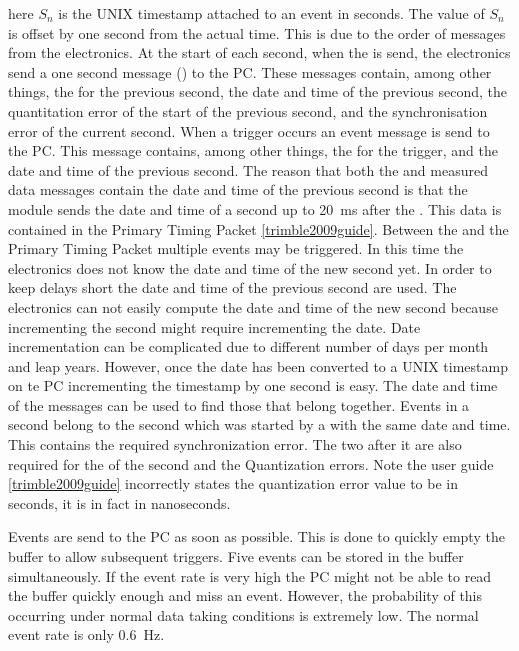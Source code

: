here $S_n$ is the UNIX timestamp attached to an event in seconds. The value of $S_n$ is offset by one second from the actual time. This is due to the order of messages from the \hisparc electronics. At the start of each second, when the \pps is send, the \hisparc electronics send a one second message (\osm) to the PC. These messages contain, among other things, the \ctp for the previous second, the date and time of the previous second, the quantitation error of the start of the previous second, and the synchronisation error of the current second. When a trigger occurs an event message is send to the PC. This message contains, among other things, the \ctd for the trigger, and the date and time of the previous second. The reason that both the \osm and measured data messages contain the date and time of the previous second is that the \gps module sends the date and time of a second up to \SI{20}{\milli\second} after the \pps. This data is contained in the Primary Timing Packet \cref{trimble2009guide}. Between the \pps and the Primary Timing Packet multiple events may be triggered. In this time the electronics does not know the date and time of the new second yet. In order to keep delays short the date and time of the previous second are used. The electronics can not easily compute the date and time of the new second because incrementing the second might require incrementing the date. Date incrementation can be complicated due to different number of days per month and leap years. However, once the date has been converted to a UNIX timestamp on te PC incrementing the timestamp by one second is easy. The date and time of the messages can be used to find those that belong together. Events in a second belong to the second which was started by a \osm with the same date and time. This \osm contains the required synchronization error. The two \osm after it are also required for the \ctp of the second and the Quantization errors. Note the user guide \cref{trimble2009guide} incorrectly states the quantization error value to be in seconds, it is in fact in nanoseconds.

Events are send to the PC as soon as possible. This is done to quickly empty the buffer to allow subsequent triggers. Five events can be stored in the buffer simultaneously. If the event rate is very high the PC might not be able to read the buffer quickly enough and miss an event. However, the probability of this occurring under normal data taking conditions is extremely low. The normal event rate is only \SI{0.6}{\hertz}.

